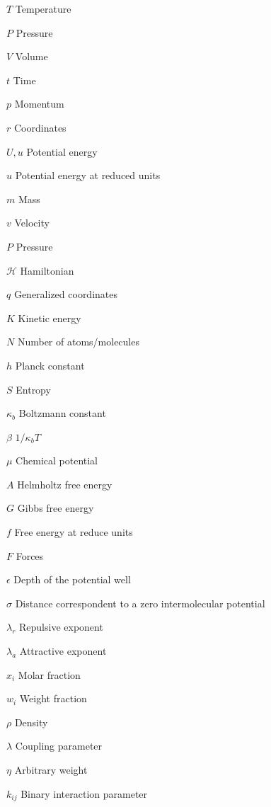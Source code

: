 \documentclass[
	12pt,				%
	openany,			%
	oneside,			%
	a4paper,			%
	english,			%
	brazil				%
	]{abntex2}
\begin{document}
\listoftables*
\cleardoublepage

\begin{simbolos}
  \item[$T$] Temperature
  \item[$P$] Pressure
  \item[$V$] Volume
  \item[$t$] Time
  \item[$p$] Momentum
  \item[$r$] Coordinates
  \item[$U,u$] Potential energy
  \item[$u$] Potential energy at reduced units
  \item[$m$] Mass
  \item[$v$] Velocity
  \item[$P$] Pressure
  \item[$ \mathcal{H} $] Hamiltonian
  \item[$q$] Generalized coordinates
  \item[$K $] 	Kinetic energy 
  \item[$N$] Number of atoms/molecules
  \item[$h$] Planck constant
  \item[$S$] Entropy
  \item[$\kappa_{b}$] Boltzmann constant
  \item[$\beta$] $1/\kappa_{b}T$
  \item[$\mu$] Chemical potential
  \item[$A$] Helmholtz free energy
  \item[$G$] Gibbs free energy
  \item[$f$] Free energy at reduce units
  \item[$F$] Forces
  \item[$\epsilon$] Depth of the potential well
  \item[$\sigma$] Distance correspondent to a zero intermolecular potential
  \item[$\lambda _{r}$] Repulsive exponent
  \item[$\lambda _{a}$] Attractive exponent
  \item[$x_{i}$] Molar fraction 
  \item[$w_{i}$] Weight fraction 
  \item[$\rho$] Density
  \item[$\lambda$] Coupling parameter 
  \item[$\eta$] Arbitrary weight 
  \item[$k_{ij}$] Binary interaction parameter
\end{simbolos}
\end{document}
